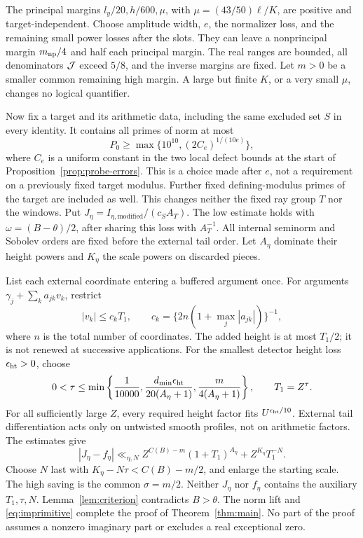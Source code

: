 \documentclass[12pt]{article}
\begin{document}
The principal margins \(l_y/20,h/600,\mu\), with
\(\mu=(43/50)\ell/K\), are positive and target-independent.
Choose amplitude width, \(e\), the normalizer loss, and the
remaining small power losses after the slots.
They can leave a nonprincipal margin \(m_{\rm np}/4\) and half each
principal margin.  The real ranges are bounded, all denominators
\({\cal J}\) exceed \(5/8\), and the inverse margins are fixed.
Let \(m>0\) be a smaller common remaining high margin.
A large but finite \(K\), or a very small \(\mu\), changes no
logical quantifier.

Now fix a target and its arithmetic data, including the same
excluded set \(S\) in every identity.  It contains all primes of norm at most
\[
 P_0\ge \max\{10^{10},(2C_e)^{1/(10e)}\},
\]
where \(C_e\) is a uniform constant in the two local defect bounds
at the start of Proposition~\ref{prop:probe-errors}.
This is a choice made after \(e\), not a requirement on a
previously fixed target modulus.  Further fixed defining-modulus
primes of the target are included as well.
This changes neither the fixed ray group \(T\) nor the windows.
Put \(J_\eta=I_{\eta,\mathrm{modified}}/(c_SA_T)\).
The low estimate holds with \(\omega=(B-\theta)/2\), after
sharing this loss with \(A_T^{-1}\).
All internal seminorm and Sobolev orders are fixed before the
external tail order.  Let \(A_\eta\) dominate their height powers
and \(K_\eta\) the scale powers on discarded pieces.

List each external coordinate entering a buffered argument once.
For arguments \(\gamma_j+\sum_k a_{jk}v_k\), restrict
\[
 |v_k|\le c_kT_1,\qquad
 c_k=\{2n(1+\max_j|a_{jk}|)\}^{-1},
\]
where \(n\) is the total number of coordinates.
The added height is at most \(T_1/2\); it is not renewed
at successive applications.
For the smallest detector height loss \(\epsilon_{\rm ht}>0\),
choose
\[
 0<\tau\le\min\left\{\frac1{10000},
 \frac{d_{\min}\epsilon_{\rm ht}}{20(A_\eta+1)},
 \frac{m}{4(A_\eta+1)}\right\},\qquad T_1=Z^\tau .
\]
For all sufficiently large \(Z\), every required height factor
fits \(U^{\epsilon_{\rm ht}/10}\).
External tail differentiation acts only on untwisted smooth
profiles, not on arithmetic factors.  The estimates give
\[
 |J_\eta-f_\eta|
 \ll_{\eta,N}Z^{C(B)-m}(1+T_1)^{A_\eta}
                     +Z^{K_\eta}T_1^{-N}.
\]
Choose \(N\) last with
\(K_\eta-N\tau<C(B)-m/2\), and enlarge the starting scale.
The high saving is the common \(\sigma=m/2\).
Neither \(J_\eta\) nor \(f_\eta\) contains the auxiliary
\(T_1,\tau,N\).
Lemma~\ref{lem:criterion} contradicts \(B>\theta\).
The norm lift and \eqref{eq:imprimitive} complete the proof of
Theorem~\ref{thm:main}.  No part of the proof assumes a nonzero
imaginary part or excludes a real exceptional zero.
\end{document}
